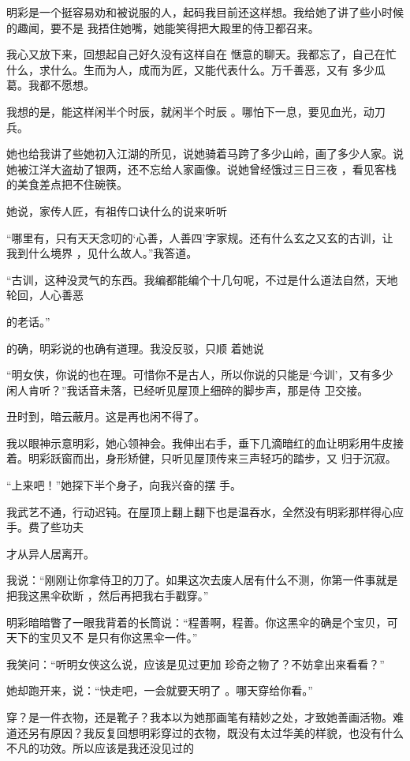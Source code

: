 \documentclass{article}
\begin{document}
明彩是一个挺容易劝和被说服的人，起码我目前还这样想。我给她了讲了些小时候的趣闻，要不是
我捂住她嘴，她能笑得把大殿里的侍卫都召来。 

我心又放下来，回想起自己好久没有这样自在
\newpage
惬意的聊天。我都忘了，自己在忙什么，求什么。生而为人，成而为匠，又能代表什么。万千善恶，又有
多少瓜葛。我都不愿想。 

我想的是，能这样闲半个时辰，就闲半个时辰
。哪怕下一息，要见血光，动刀兵。 

她也给我讲了些她初入江湖的所见，说她骑着马跨了多少山岭，画了多少人家。说她被江洋大盗劫了银两，还不忘给人家画像。说她曾经饿过三日三夜
，看见客栈的美食差点把不住碗筷。 

她说，家传人匠，有祖传口诀什么的说来听听

“哪里有，只有天天念叨的‘心善，人善四’字家规。还有什么玄之又玄的古训，让我到什么境界
，见什么故人。”我答道。 

“古训，这种没灵气的东西。我编都能编个十几句呢，不过是什么道法自然，天地轮回，人心善恶

\newpage
的老话。” 

的确，明彩说的也确有道理。我没反驳，只顺
着她说 

“明女侠，你说的也在理。可惜你不是古人，所以你说的只能是‘今训’，又有多少闲人肯听？”我话音未落，已经听见屋顶上细碎的脚步声，那是侍
卫交接。 


丑时到，暗云蔽月。这是再也闲不得了。 

我以眼神示意明彩，她心领神会。我伸出右手，垂下几滴暗红的血让明彩用牛皮接着。明彩跃窗而出，身形矫健，只听见屋顶传来三声轻巧的踏步，又
归于沉寂。 

“上来吧！”她探下半个身子，向我兴奋的摆
手。 

我武艺不通，行动迟钝。在屋顶上翻上翻下也是温吞水，全然没有明彩那样得心应手。费了些功夫
\newpage

才从异人居离开。 

我说：“刚刚让你拿侍卫的刀了。如果这次去废人居有什么不测，你第一件事就是把我这黑伞砍断
，然后再把我右手戳穿。” 

明彩暗暗瞥了一眼我背着的长筒说：“程善啊，程善。你这黑伞的确是个宝贝，可天下的宝贝又不
是只有你这黑伞一件。” 

我笑问：“听明女侠这么说，应该是见过更加
珍奇之物了？不妨拿出来看看？” 

她却跑开来，说：“快走吧，一会就要天明了
。哪天穿给你看。” 

穿？是一件衣物，还是靴子？我本以为她那画笔有精妙之处，才致她善画活物。难道还另有原因？我反复回想明彩穿过的衣物，既没有太过华美的样貌，也没有什么不凡的功效。所以应该是我还没见过的
\end{document}

